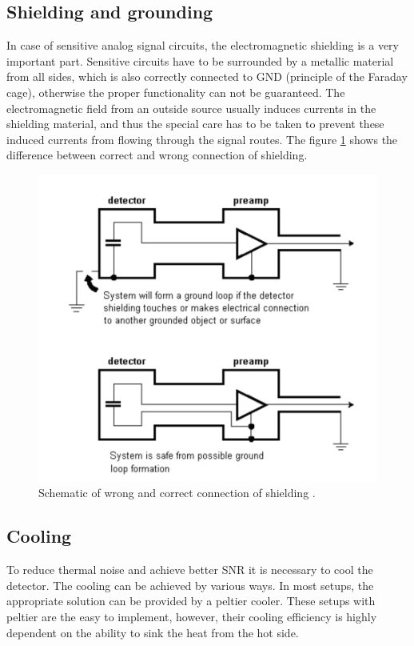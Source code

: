 \subsection{Shielding and grounding}

In case of sensitive analog signal circuits, the electromagnetic shielding is a very important part. Sensitive circuits have to be surrounded by a metallic material from all sides, which is also correctly connected to GND (principle of the Faraday cage), otherwise the proper functionality can not be guaranteed. The electromagnetic field from an outside source usually induces currents in the shielding material, and thus the special care has to be taken to prevent these induced currents from flowing through the signal routes. The figure \ref{shielding} shows the difference between correct and wrong connection of shielding.

\begin{figure}[H]
 \centering
 \includegraphics[scale=0.35, angle = 0]{./pictures/shielding.png}
 \caption{Schematic of wrong and correct connection of shielding \cite{appCSPnote}.}
 \label{shielding}
 
\end{figure}



\subsection{Cooling}
To reduce thermal noise and achieve better SNR it is necessary to cool the detector. The cooling can be achieved by various ways. In most setups, the appropriate solution can be provided by a peltier cooler. These setups with peltier are the easy to implement, however, their cooling efficiency is highly dependent on the ability to sink the heat from the hot side.

